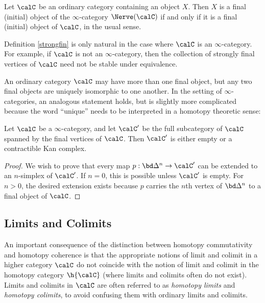 \begin{example}
Let $\calC$ be an ordinary category containing an object $X$. Then $X$ is a final (initial)
object of the $\infty$-category $\Nerve(\calC)$ if and only if it is a final (initial) object of $\calC$, in the usual sense.
\end{example}

\begin{remark}
Definition \ref{strongfin} is only natural in the case where $\calC$ is an $\infty$-category. For example, if $\calC$ is not an $\infty$-category, then the collection of strongly final vertices of $\calC$ need not be stable under equivalence.
\end{remark}

An ordinary category $\calC$ may have more than one final object,
but any two final objects are uniquely isomorphic to one another.
In the setting of $\infty$-categories, an analogous statement holds,
but is slightly more complicated because the word ``unique'' needs to be
interpreted in a homotopy theoretic sense:

\begin{proposition}[Joyal]\label{initunique}
Let $\calC$ be a $\infty$-category, and let $\calC'$ be the full subcategory
of $\calC$ spanned by the final vertices of $\calC$. Then $\calC'$ is either empty or
a contractible Kan complex.
\end{proposition}

\begin{proof}
We wish to prove that every map $p: \bd \Delta^n \rightarrow \calC'$
can be extended to an $n$-simplex of $\calC'$. If $n = 0$, this is
possible unless $\calC'$ is empty. For $n > 0$, the desired extension exists
because $p$ carries the $n$th vertex of $\bd \Delta^n$ to a final
object of $\calC$.
\end{proof}

\subsection{Limits and Colimits}\label{limitcolimit}

An important consequence of the distinction between homotopy
commutativity and homotopy coherence is that the appropriate
notions of limit and colimit in a higher category
$\calC$ do not coincide with the notion of limit and colimit in the homotopy category $\h{\calC}$ (where limits and colimits often do
not exist). Limits and colimits in
$\calC$ are often referred to as {\it homotopy limits} and
{\it homotopy colimits}, to avoid confusing them with ordinary limits
and colimits.

